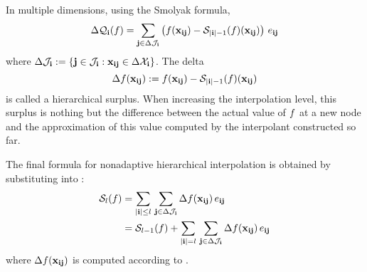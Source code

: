 In multiple dimensions, using the Smolyak formula,
\begin{equation} \elab{tensor-delta}
  \Delta\tensor{\vi}(\f) = \sum_{\vj \in \Delta\index_\vi} \left( \f(\vx_{\vi\vj}) - \smolyak{|\vi| - 1}(\f)(\vx_{\vi\vj}) \right) \, \e_{\vi\vj}
\end{equation}
where $\Delta\mathcal{J}_{\mathbf{i}} := \{ \mathbf{j} \in \mathcal{J}_{\mathbf{i}}: \mathbf{x}_{\mathbf{i}\mathbf{j}} \in \Delta\mathcal{X}_{\mathbf{i}}
\}$. The delta
\begin{equation} \elab{surplus}
  \surplus(\vx_{\vi\vj}) := \f(\vx_{\vi\vj}) - \smolyak{|\vi| - 1}(\f)(\vx_{\vi\vj})
\end{equation}
is called a hierarchical surplus. When increasing the interpolation level, this
surplus is nothing but the difference between the actual value of $f$ at a new
node and the approximation of this value computed by the interpolant constructed
so far.

The final formula for nonadaptive hierarchical interpolation is obtained by
substituting  into :
\begin{align}
  \smolyak{\l}(\f) &= \sum_{|\vi| \leq \l} \, \sum_{\vj \in \Delta\index_\vi} \surplus(\vx_{\vi\vj}) \, \e_{\vi\vj} \elab{smolyak-hierarchical} \\
                  &= \smolyak{\l-1}(\f) + \sum_{|\vi| = \l} \, \sum_{\vj \in \Delta\index_\vi} \surplus(\vx_{\vi\vj}) \, \e_{\vi\vj} \nonumber
\end{align}
where $\Delta f(\mathbf{x}_{\mathbf{i}\mathbf{j}})$ is computed according to .
